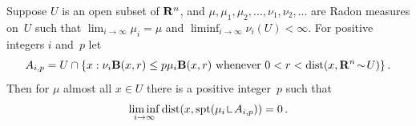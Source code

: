 \begin{lemma}
    \label{al:2.7(2)}
    Suppose $U$ is an open subset of $\mathbf{R}^{n}$, and $\mu, \mu_1, \mu_2, \ldots, \nu_1, \nu_2,
    \ldots$ are Radon measures on~$U$ such that $\lim_{i \to \infty} \mu_i = \mu$ and
    $\liminf_{i \to \infty} \nu_i(U) < \infty$. For positive integers $i$ and~$p$ let
    \begin{displaymath}
        A_{i,p} = U \cap \{ x : \nu_i \mathbf{B}(x,r) \le p \mu_i \mathbf{B}(x,r) \text{ whenever } 0
        < r < \operatorname{dist}(x, \mathbf{R}^{n} \!\sim\! U) \} \,.
    \end{displaymath}
    Then for $\mu$ almost all $x \in U$ there is a positive integer~$p$ such that
    \begin{displaymath}
        \liminf_{i \to \infty} \dist(x, \spt(\mu_i \restrict A_{i,p})) = 0 \,.
    \end{displaymath}
\end{lemma}

